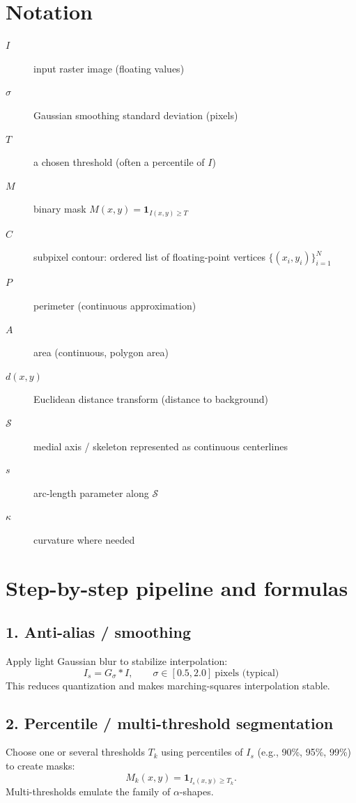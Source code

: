\documentclass[11pt]{article}
\begin{document}
\section{Notation}
\begin{description}
  \item[\(I\)] input raster image (floating values)
  \item[\(\sigma\)] Gaussian smoothing standard deviation (pixels)
  \item[\(T\)] a chosen threshold (often a percentile of \(I\))
  \item[\(M\)] binary mask \(M(x,y) = \mathbf{1}_{I(x,y) \ge T}\)
  \item[\(C\)] subpixel contour: ordered list of floating-point vertices \(\{(x_i,y_i)\}_{i=1}^{N}\)
  \item[\(P\)] perimeter (continuous approximation)
  \item[\(A\)] area (continuous, polygon area)
  \item[\(d(x,y)\)] Euclidean distance transform (distance to background)
  \item[\(\mathcal{S}\)] medial axis / skeleton represented as continuous centerlines
  \item[\(s\)] arc-length parameter along \(\mathcal{S}\)
  \item[\(\kappa\)] curvature where needed
\end{description}

\section{Step-by-step pipeline and formulas}

\subsection{1. Anti-alias / smoothing}
Apply light Gaussian blur to stabilize interpolation:
\[
I_s = G_{\sigma} * I,\qquad \sigma \in [0.5,2.0]\ \text{pixels (typical)}
\]
This reduces quantization and makes marching-squares interpolation stable.

\subsection{2. Percentile / multi-threshold segmentation}
Choose one or several thresholds \(T_k\) using percentiles of \(I_s\) (e.g., 90\%, 95\%, 99\%) to create masks:
\[
M_k(x,y) = \mathbf{1}_{I_s(x,y) \ge T_k}.
\]
Multi-thresholds emulate the family of \(\alpha\)-shapes.
\end{document}
